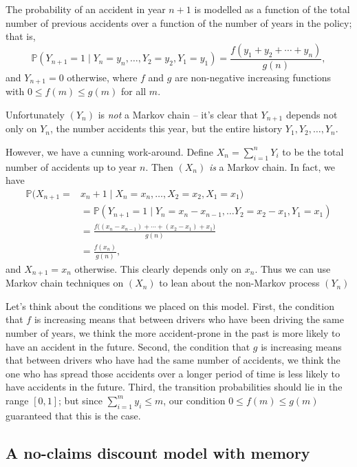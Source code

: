 \documentclass[
  a4paper,
]{article}
\theoremstyle{definition}
\theoremstyle{definition}
\theoremstyle{definition}
\theoremstyle{remark}
\begin{document}
The probability of an accident in year \(n+1\) is modelled as a function of the total number of previous accidents over a function of the number of years in the policy; that is,
\[
\mathbb P(Y_{n+1}= 1 \mid Y_n=y_{n},\dots ,Y_2=y_{2},Y_1=y_{1} )=\frac{f(y_1+y_2+\cdots +y_n)}{g(n)},
\]
and \(Y_{n+1} = 0\) otherwise,
where \(f\) and \(g\) are non-negative increasing functions with \(0\leq f(m)\leq g(m)\) for all \(m\).

Unfortunately \((Y_n)\) is \emph{not} a Markov chain -- it's clear that \(Y_{n+1}\) depends not only on \(Y_n\), the number accidents this year, but the entire history \(Y_1, Y_2, \dots, Y_n\).

However, we have a cunning work-around. Define \(X_n=\sum_{i=1}^n Y_i\) to be the total number of accidents up to year \(n\). Then \((X_n)\) \emph{is} a Markov chain. In fact, we have
\begin{align*}
    \mathbb P(X_{n+1}={}&{}x_{n}+1\mid X_n=x_n, \dots, X_2=x_2, X_1=x_1)\\
    &=\mathbb P(Y_{n+1}=1\mid Y_n=x_n - x_{n-1}, \dots Y_2=x_2-x_1, Y_1=x_1)\\
    &=\frac{f\big((x_n-x_{n-1}) +\cdots +(x_2-x_1) + x_1\big)}{g(n)}\\
    &=\frac{f(x_n)}{g(n)},
\end{align*}
and \(X_{n+1} = x_n\) otherwise. This clearly depends only on \(x_n\). Thus we can use Markov chain techniques on \((X_n)\) to lean about the non-Markov process \((Y_n)\)

Let's think about the conditions we placed on this model. First, the condition that \(f\) is increasing means that between drivers who have been driving the same number of years, we think the more accident-prone in the past is more likely to have an accident in the future. Second, the condition that \(g\) is increasing means that between drivers who have had the same number of accidents, we think the one who has spread those accidents over a longer period of time is less likely to have accidents in the future. Third, the transition probabilities should lie in the range \([0,1]\); but since \(\sum_{i=1}^m y_i\leq m\), our condition \(0\leq f(m)\leq g(m)\) guaranteed that this is the case.

\hypertarget{S06-example3}{%
\subsection{A no-claims discount model with memory}\label{S06-example3}}
\end{document}

